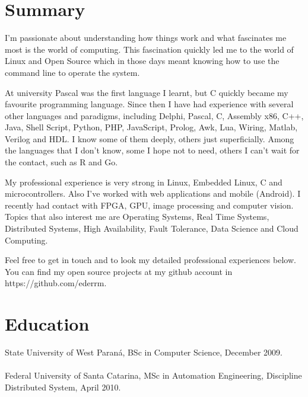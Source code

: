 \documentclass[margin]{eder}
\begin{document}
  

\address{Manaus, BR \\ eder.rm82@gmail.com \\ Phone: 069 242424 }
                                   
\begin{resume}                        
 
\section{Summary}    

I'm passionate about understanding how things work and what fascinates me most is the world of computing. This fascination quickly led me to the world of Linux and Open Source which in those days meant knowing how to use the command line to operate the system.

At university Pascal was the first language I learnt, but C quickly became my favourite programming language. Since then I have had experience with several other languages and paradigms, including Delphi, Pascal, C, Assembly x86, C++, Java, Shell Script, Python, PHP, JavaScript, Prolog, Awk, Lua, Wiring, Matlab, Verilog and HDL. I know some of them deeply, others just superficially. Among the languages that I don't know, some I hope not to need, others I can't wait for the contact, such as R and Go.

My professional experience is very strong in Linux, Embedded Linux, C and microcontrollers. Also I've worked with web applications and mobile (Android). I recently had contact with FPGA, GPU, image processing and computer vision. Topics that also interest me are Operating Systems, Real Time Systems, Distributed Systems, High Availability, Fault Tolerance, Data Science and Cloud Computing.

Feel free to get in touch and to look my detailed professional experiences below. You can find my open source projects at my github account in https://github.com/ederrm.
 
\section{Education}	State University of West Paraná, BSc in Computer Science, December 2009.\\ \\
                    Federal University of Santa Catarina, MSc in Automation Engineering, Discipline Distributed System, April 2010.
  

\end{resume}
\end{document}
